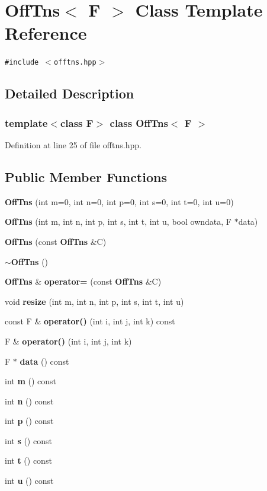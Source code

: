 \section{Off\-Tns$<$ F $>$ Class Template Reference}
\label{classOffTns}
{\tt \#include $<$offtns.hpp$>$}



\subsection{Detailed Description}
\subsubsection*{template$<$class F$>$ class Off\-Tns$<$ F $>$}





Definition at line 25 of file offtns.hpp.\subsection*{Public Member Functions}
\begin{CompactItemize}
\item 
{\bf Off\-Tns} (int m=0, int n=0, int p=0, int s=0, int t=0, int u=0)
\item 
{\bf Off\-Tns} (int m, int n, int p, int s, int t, int u, bool owndata, F $\ast$data)
\item 
{\bf Off\-Tns} (const {\bf Off\-Tns} \&C)
\item 
{\bf $\sim$Off\-Tns} ()
\item 
{\bf Off\-Tns} \& {\bf operator=} (const {\bf Off\-Tns} \&C)
\item 
void {\bf resize} (int m, int n, int p, int s, int t, int u)
\item 
const F \& {\bf operator()} (int i, int j, int k) const 
\item 
F \& {\bf operator()} (int i, int j, int k)
\item 
F $\ast$ {\bf data} () const 
\item 
int {\bf m} () const 
\item 
int {\bf n} () const 
\item 
int {\bf p} () const 
\item 
int {\bf s} () const 
\item 
int {\bf t} () const 
\item 
int {\bf u} () const 
\end{CompactItemize}
